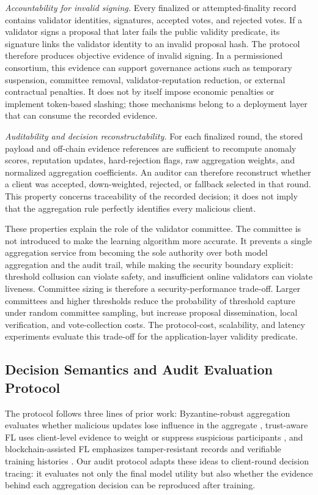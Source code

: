 \documentclass[preprint,12pt]{elsarticle}
\begin{document}
\emph{Accountability for invalid signing.} Every finalized or attempted-finality record contains validator identities, signatures, accepted votes, and rejected votes. If a validator signs a proposal that later fails the public validity predicate, its signature links the validator identity to an invalid proposal hash. The protocol therefore produces objective evidence of invalid signing. In a permissioned consortium, this evidence can support governance actions such as temporary suspension, committee removal, validator-reputation reduction, or external contractual penalties. It does not by itself impose economic penalties or implement token-based slashing; those mechanisms belong to a deployment layer that can consume the recorded evidence.

\emph{Auditability and decision reconstructability.} For each finalized round, the stored payload and off-chain evidence references are sufficient to recompute anomaly scores, reputation updates, hard-rejection flags, raw aggregation weights, and normalized aggregation coefficients. An auditor can therefore reconstruct whether a client was accepted, down-weighted, rejected, or fallback selected in that round. This property concerns traceability of the recorded decision; it does not imply that the aggregation rule perfectly identifies every malicious client.

These properties explain the role of the validator committee. The committee is not introduced to make the learning algorithm more accurate. It prevents a single aggregation service from becoming the sole authority over both model aggregation and the audit trail, while making the security boundary explicit: threshold collusion can violate safety, and insufficient online validators can violate liveness. Committee sizing is therefore a security-performance trade-off. Larger committees and higher thresholds reduce the probability of threshold capture under random committee sampling, but increase proposal dissemination, local verification, and vote-collection costs. The protocol-cost, scalability, and latency experiments evaluate this trade-off for the application-layer validity predicate.

\subsection{Decision Semantics and Audit Evaluation Protocol}

The protocol follows three lines of prior work: Byzantine-robust aggregation evaluates whether malicious updates lose influence in the aggregate \citep{blanchard2017krum,yin2018byzantine,pillutla2022rfa}, trust-aware FL uses client-level evidence to weight or suppress suspicious participants \citep{cao2021fltrust,fung2020foolsgold}, and blockchain-assisted FL emphasizes tamper-resistant records and verifiable training histories \citep{lu2020blockchain,nguyen2021blockchainedge,dong2024blockchain,awan2022blockchainflsurvey}. Our audit protocol adapts these ideas to client-round decision tracing: it evaluates not only the final model utility but also whether the evidence behind each aggregation decision can be reproduced after training.
\end{document}
